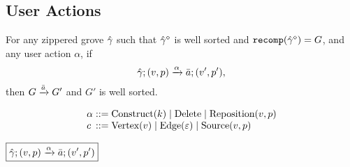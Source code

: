 \subsection{User Actions}

\begin{theorem}[Sensibility]
  For any zippered grove $\Z{\Grove}$
  such that $\erase{\Z{\Grove}}$ is well sorted
    and $\recomp{\erase{\Z{\Grove}}} = G$,
  and any user action $\alpha$,
  if
  \[
    \applyAction{\Z{\Grove}}{v}{p}{\alpha}{\Q{a}}{v'}{p'},
  \]
  then $G \action{\Q{a}} G'$ and $G'$ is well sorted.
\end{theorem}

\[
  \arraycolsep=0pt
  \begin{array}{llll}
    \alpha & {}::={} &
      \Construct{k}
      \mid \Delete
      \mid \Reposition{v}{p}
    \\
    c & {}::={} &
      \CVertex{v}
      \mid \CEdge{\e}
      \mid \CSource{v}{p}
    \\
  \end{array}
\]

\noindent $\boxed{\applyAction{ \Z{\Grove} }{ v }{ p }{ \alpha }{ \Q{a} }{ v' }{ p' }}$
%
\begin{mathpar}


\end{mathpar}

